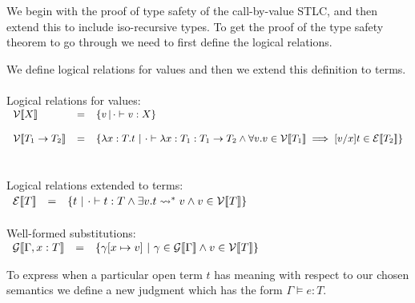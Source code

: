 We begin with the proof of type safety of the call-by-value STLC, and
then extend this to include iso-recursive types.  To get the proof of
the type safety theorem to go through we need to first define the
logical relations.
\begin{definition}
  \label{def:logical_relations}
  We define logical relations for values and then we extend this definition to
  terms.\\
  \ \\
  Logical relations for values: \\
  \begin{math}
    \small
    \begin{array}{lllll}
      \mathcal{V}\interp{X} & = &  \{ v\,|\, \cdot \vdash v : X \} \\
      & \\
      \mathcal{V}\interp{T_1 \to T_2} & = & \{ \lambda x:T.t\ |\ 
      \cdot \vdash \lambda x:T_1 : T_1 \to T_2 \land
      \forall v.v \in \mathcal{V} \interp{T_1} \implies 
              [v/x]t \in \mathcal{E}\interp{T_2} \}\\
    \end{array}
  \end{math}
  \ \\
  \ \\
  Logical relations extended to terms:\\
  \begin{math}
    \begin{array}{lll}
      \mathcal{E}[\negthinspace[T]\negthinspace] & = & \{ t\ |\ \cdot \vdash t:T \land 
      \exists v.t \rightsquigarrow^* v \land v \in \mathcal{V}[\negthinspace[T]\negthinspace] \}
    \end{array}
  \end{math}
  \ \\
  \ \\
  Well-formed substitutions:\\
  \begin{math}
    \begin{array}{lllll}
        \mathcal{G}[\negthinspace[\Gamma,x:T]\negthinspace] & = & 
        \{ \gamma[x \mapsto v]\ |\ \gamma \in \mathcal{G}[\negthinspace[\Gamma]\negthinspace] \land 
        v \in \mathcal{V}[\negthinspace[T]\negthinspace] \}
    \end{array}
  \end{math}
\end{definition}
To express when a particular open term $t$ has meaning with respect to our chosen 
semantics we define a new judgment which has the form $\Gamma \models e : T$.
